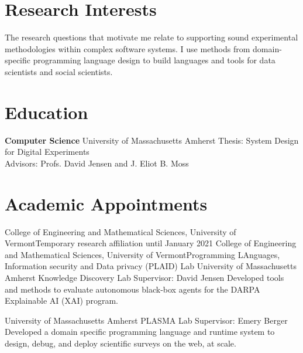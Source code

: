 \documentclass[11pt,a4paper,sans]{moderncv} %
\newcommand{\umass}{University of Massachusetts Amherst}
\newcommand{\cems}{College of Engineering and Mathematical Sciences}
\newcommand{\uvm}{University of Vermont}
\begin{document}
\makecvtitle %
\section{Research Interests}
The research questions that motivate me relate to supporting sound experimental methodologies within complex software systems. I use methods from  domain-specific programming language design to build languages and tools for data scientists and social scientists.

\section{Education}
 {\textbf{Computer Science}}
 {}
 {\umass{}}
 {Thesis: System Design for Digital Experiments\\Advisors: Profs. David Jensen and J. Eliot B. Moss}





\section{Academic Appointments}
{\cems{}, \uvm{}}{Temporary research affiliation until January 2021}{}{}
 {\cems{}, \uvm{}}{Programming LAnguages, Information security and Data privacy (PLAID) Lab}{}{}
 {\umass{}}
 {Knowledge Discovery Lab}
 {Supervisor: David Jensen}
 {Developed tools and methods to evaluate autonomous black-box agents for the DARPA Explainable AI (XAI) program.}
 
 {\umass{}}
 {PLASMA Lab}
 {Supervisor: Emery Berger}
 {Developed a domain specific programming language and runtime system to design, debug, and deploy scientific surveys on the web, at scale.}
 
\end{document}

